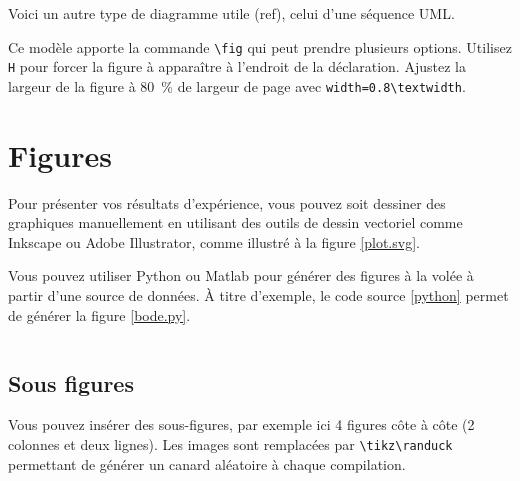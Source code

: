 Voici un autre type de diagramme utile (ref), celui d'une séquence UML.


Ce modèle apporte la commande \verb!\fig! qui peut prendre plusieurs options. Utilisez \verb!H! pour forcer la figure à apparaître à l'endroit de la déclaration. Ajustez la largeur de la figure à \SI{80}{\percent} de largeur de page avec \verb!width=0.8\textwidth!.

\section{Figures}

Pour présenter vos résultats d'expérience, vous pouvez soit dessiner des graphiques manuellement en utilisant des outils de dessin vectoriel comme Inkscape ou Adobe Illustrator, comme illustré à la figure \ref{plot.svg}.


Vous pouvez utiliser Python ou Matlab pour générer des figures à la volée à partir d'une source de données. À titre d'exemple, le code source \ref{python} permet de générer la figure \ref{bode.py}.
\begin{listing}[ht]
    \inputminted{python}{assets/figures/bode.py}
    \caption{Génération d'un diagramme de Bode \label{python}}
\end{listing}


\subsection{Sous figures}

Vous pouvez insérer des sous-figures, par exemple ici 4 figures côte à côte (2 colonnes et deux lignes). Les images sont remplacées par \verb!\tikz\randuck! permettant de générer un canard aléatoire à chaque compilation.

